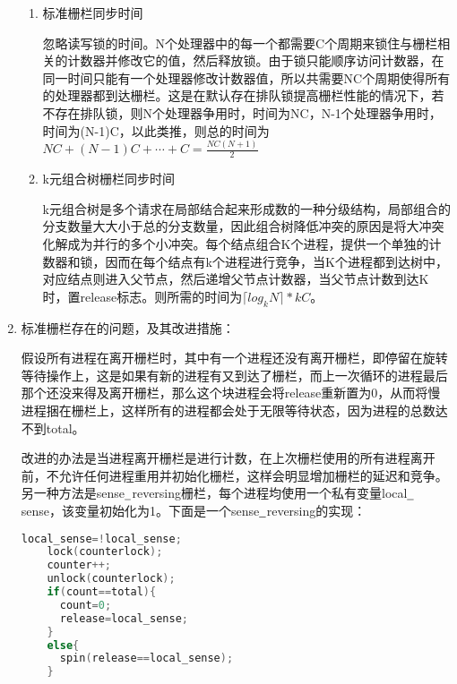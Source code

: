 \documentclass[a4paper]{ctexart}
\newcommand{\li}{\uline{\hspace{0.5em}}}
\begin{document}
\begin{enumerate}
\begin{enumerate}
    \item 标准栅栏同步时间
    
    忽略读写锁的时间。N个处理器中的每一个都需要C个周期来锁住与栅栏相关的计数器并修改它的值，然后释放锁。由于锁只能顺序访问计数器，在同一时间只能有一个处理器修改计数器值，所以共需要NC个周期使得所有的处理器都到达栅栏。这是在默认存在排队锁提高栅栏性能的情况下，若不存在排队锁，则N个处理器争用时，时间为NC，N-1个处理器争用时，时间为(N-1)C，以此类推，则总的时间为$NC+(N-1)C+\cdots+C=\frac{NC(N+1)}{2}$
    
    \item k元组合树栅栏同步时间
    
    k元组合树是多个请求在局部结合起来形成数的一种分级结构，局部组合的分支数量大大小于总的分支数量，因此组合树降低冲突的原因是将大冲突化解成为并行的多个小冲突。每个结点组合K个进程，提供一个单独的计数器和锁，因而在每个结点有k个进程进行竞争，当K个进程都到达树中，对应结点则进入父节点，然后递增父节点计数器，当父节点计数到达K时，置release标志。则所需的时间为$\lceil log_kN \rceil*kC$。
      
  \end{enumerate}
  
  \item 标准栅栏存在的问题，及其改进措施：
  
  假设所有进程在离开栅栏时，其中有一个进程还没有离开栅栏，即停留在旋转等待操作上，这是如果有新的进程有又到达了栅栏，而上一次循环的进程最后那个还没来得及离开栅栏，那么这个块进程会将release重新置为0，从而将慢进程捆在栅栏上，这样所有的进程都会处于无限等待状态，因为进程的总数达不到total。
  
  改进的办法是当进程离开栅栏是进行计数，在上次栅栏使用的所有进程离开前，不允许任何进程重用并初始化栅栏，这样会明显增加栅栏的延迟和竞争。
  另一种方法是sense$\li$reversing栅栏，每个进程均使用一个私有变量local$\li$sense，该变量初始化为1。下面是一个sense$\li$reversing的实现：
  \begin {lstlisting}[language=c]
    local_sense=!local_sense;
    lock(counterlock);
    counter++;
    unlock(counterlock);
    if(count==total){
      count=0;
      release=local_sense;
    }
    else{
      spin(release==local_sense);
    }
  \end{lstlisting}
    

\end{enumerate}
\end{document}
